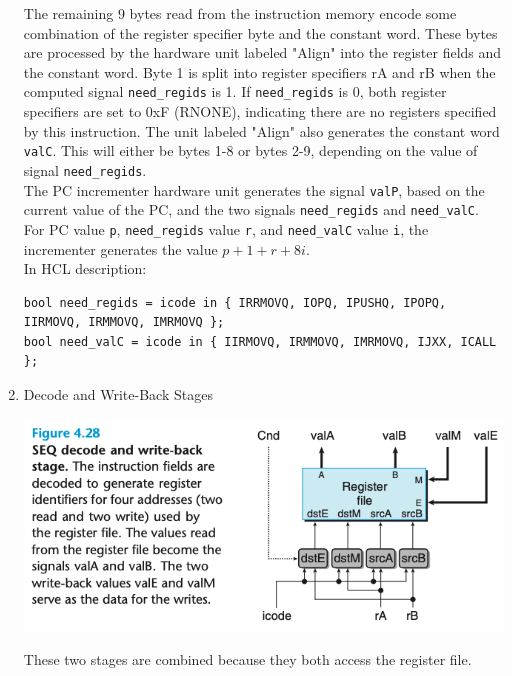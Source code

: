 \documentclass[11pt]{article}
\begin{document}
\begin{enumerate}
The remaining 9 bytes read from the instruction memory encode some combination of the register specifier byte and the constant word. These bytes are processed by the hardware unit labeled "Align" into the register fields and the constant word. Byte 1 is split into register specifiers rA and rB when the computed signal \texttt{need\_regids} is 1. If \texttt{need\_regids} is 0, both register specifiers are set to 0xF (RNONE), indicating there are no registers specified by this instruction. The unit labeled "Align" also generates the constant word \texttt{valC}. This will either be bytes 1-8 or bytes 2-9, depending on the value of signal \texttt{need\_regids}.\\


The PC incrementer hardware unit generates the signal \texttt{valP}, based on the current value of the PC, and the two signals \texttt{need\_regids} and \texttt{need\_valC}. For PC value \texttt{p}, \texttt{need\_regids} value \texttt{r}, and \texttt{need\_valC} value \texttt{i}, the incrementer generates the value \(p + 1 + r + 8i\).\\

In HCL description:\\
\begin{verbatim}
bool need_regids = icode in { IRRMOVQ, IOPQ, IPUSHQ, IPOPQ, IIRMOVQ, IRMMOVQ, IMRMOVQ };
bool need_valC = icode in { IIRMOVQ, IRMMOVQ, IMRMOVQ, IJXX, ICALL };
\end{verbatim}

\item Decode and Write-Back Stages
\label{sec:org77c4043}

\begin{center}
\includegraphics[width=.9\linewidth]{pics/figure4.28-decode-and-write-back-stage.png}
\end{center}

These two stages are combined because they both access the register file.\\


\end{enumerate}
\end{document}
